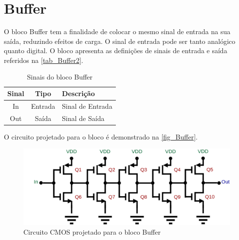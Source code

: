 \renewcommand{\NomeBloco}{Buffer}
\renewcommand{\NomePTab}{tab_\NomeBloco}
\renewcommand{\NomeSTab}{tab_\NomeBloco2}
\renewcommand{\NomePFig}{fig_\NomeBloco}
\renewcommand{\NomeSFig}{fig_\NomeBloco2}
\renewcommand{\NomeTTab}{tab_\NomeBloco3}

\section{\NomeBloco}
\label{inversor1}

O bloco \NomeBloco{} tem a finalidade de colocar o mesmo sinal de entrada na sua sa\'ida, reduzindo efeitos de carga. O sinal de entrada pode ser tanto anal\'ogico quanto digital. O bloco apresenta as defini{\c c}\~oes de sinais de entrada e sa\'ida referidos na \autoref{\NomeSTab}.

\begin{table}[htb]
\caption{Sinais do bloco \NomeBloco}
\label{\NomeSTab}
\centering
\begin{tabular}{ccl}

    \toprule
    Sinal & Tipo    & Descri{\c c}\~ao        \\
    \midrule \midrule
    In    & Entrada & Sinal de Entrada \\
    \midrule
    Out   & Saída   & Sinal de Sa\'ida   \\
    \bottomrule
\end{tabular}
\end{table}

O circuito projetado para o bloco \'e demonstrado na \autoref{\NomePFig}.

\begin{figure}[htb]
 \label{NomePFig}
 \centering
    \caption{Circuito CMOS projetado para o bloco \NomeBloco} \label{\NomePFig}
    \includegraphics[scale=0.3]{Circuitos/Buffer.png}
\end{figure}

